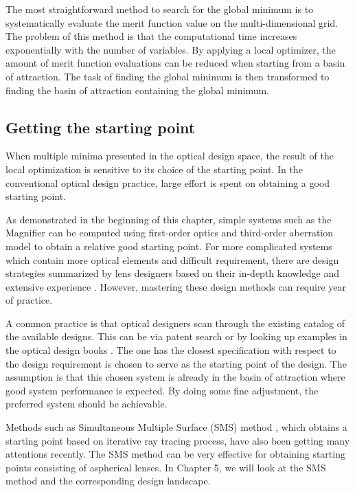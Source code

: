 The most straightforward method to search for the global minimum is to systematically evaluate the merit function value on the multi-dimensional grid. The problem of this method is that the computational time increases exponentially with the number of variables. By applying a local optimizer, the amount of merit function evaluations can be reduced when starting from a basin of attraction. The task of finding the global minimum is then transformed to finding the basin of attraction containing the global minimum. 

\subsection{Getting the starting point}
When multiple minima presented in the optical design space, the result of the local optimization is sensitive to its choice of the starting point. In the conventional optical design practice, large effort is spent on obtaining a good starting point. 

As demonstrated in the beginning of this chapter, simple systems such as the Magnifier can be computed using first-order optics and third-order aberration model to obtain a relative good starting point. For more complicated systems which contain more optical elements and difficult requirement, there are design strategies summarized by lens designers based on their in-depth knowledge and extensive experience \cite{LivshitsQA2013}\cite{Shafer1995_moreless}. However, mastering these design methods can require year of practice.   

A common practice is that optical designers scan through the existing catalog of the available designs. This can be via patent search or by looking up examples in the optical design books \cite{smith1992modern} \cite{book:SmithModernOpticalEngineering}.  The one has the closest specification with respect to the design requirement is chosen to serve as the  starting point of the design. The assumption is that this chosen system is already in the basin of attraction where good system performance is expected. By doing some fine adjustment, the preferred system should be achievable. 

Methods such as Simultaneous Multiple Surface (SMS) method \cite{MinanoOE09}, which obtains a starting point based on iterative ray tracing process, have also been getting many attentions recently. The SMS method can be very effective for obtaining starting points consisting of aspherical lenses. In Chapter 5, we will look at the SMS method and the corresponding design landscape. 

